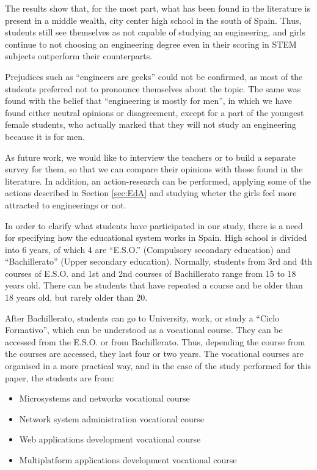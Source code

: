 \documentclass[journal,transmag]{IEEEtran}
\begin{document}
The results show that, for the most part, what has been found in the literature is present in a middle wealth, city center high school in the south of Spain. Thus, students still see themselves as not capable of studying an engineering, and girls continue to not choosing an engineering degree even in their scoring in STEM subjects outperform their counterparts.

Prejudices such as ``engineers are geeks'' could not be confirmed, as most of the students preferred not to pronounce themselves about the topic. The same was found with the belief that ``engineering is mostly for men'', in which we have found either neutral opinions or disagreement, except for a part of the youngest female students, who actually marked that they will not study an engineering because it is for men.

As future work, we would like to interview the teachers or to build a separate survey for them, so that we can compare their opinions with those found in the literature. In addition, an action-research can be performed, applying some of the actions described in Section \ref{sec:EdA} and studying wheter the girls feel more attracted to engineerings or not.

\label{ap:courses}

In order to clarify what students have participated in our study, there is a need for specifying how the educational system works in Spain. High school is divided into 6 years, of which 4 are ``E.S.O.'' (Compulsory secondary education) and ``Bachillerato'' (Upper secondary education). Normally, students from 3rd and 4th courses of E.S.O. and 1st and 2nd courses of Bachillerato range from 15 to 18 years old. There can be students that have repeated a course and be older than 18 years old, but rarely older than 20.

After Bachillerato, students can go to University, work, or study a ``Ciclo Formativo'', which can be understood as a vocational course. They can be accessed from the E.S.O. or from Bachillerato. Thus, depending the course from the courses are accessed, they last four or two years. The vocational courses are organised in a more practical way, and in the case of the study performed for this paper, the students are from:

\begin{itemize}
  \item Microsystems and networks vocational course
  \item Network system administration vocational course
  \item Web applications development vocational course
  \item Multiplatform applications development vocational course
\end{itemize}
\end{document}
